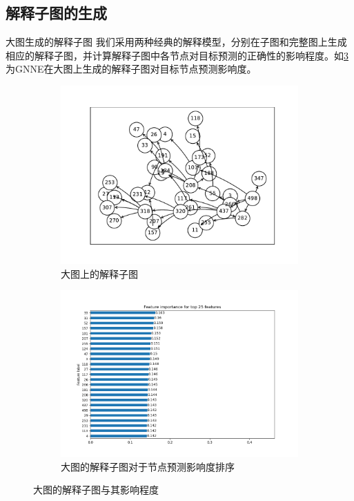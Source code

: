 \documentclass[UTF8, aspectratio=169,10pt]{beamer}%
\numberwithin{equation}{section}
\numberwithin{figure}{section}
\numberwithin{table}{section}
\theoremstyle{definition}
\begin{document}
\subsection{解释子图的生成}
\begin{frame}{大图生成的解释子图}
我们采用两种经典的解释模型，分别在子图和完整图上生成相应的解释子图，并计算解释子图中各节点对目标预测的正确性的影响程度。如\cref{fig:cc2}为GNNE在大图上生成的解释子图对目标节点预测影响度。
	\begin{figure}[h]
		\centering
		\begin{subfigure}[b]{0.40\textwidth}
			\centering
			\includegraphics[width=\textwidth]{fig/w91}
			\caption{大图上的解释子图}
			\label{fig:subgraph}
		\end{subfigure}
		\hfill
		\begin{subfigure}[b]{0.40\textwidth}
			\centering
			\includegraphics[width=\textwidth]{fig/w92}
			\caption{大图的解释子图对于节点预测影响度排序}
			\label{fig:wholegraph}
		\end{subfigure}
		\caption{大图的解释子图与其影响程度}
		\label{fig:cc2}
	\end{figure}
	
\end{frame}
\end{document}

